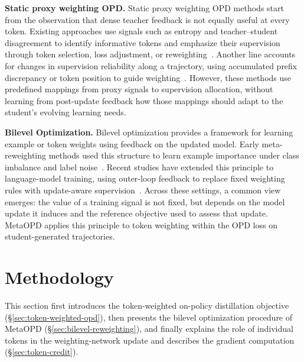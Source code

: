 \documentclass{article}
\theoremstyle{plain}
\theoremstyle{definition}
\theoremstyle{remark}
\begin{document}
\textbf{Static proxy weighting OPD.}
Static proxy weighting OPD methods start from the observation that dense teacher feedback is not equally useful at every token.
Existing approaches use signals such as entropy and teacher--student disagreement to identify informative tokens and emphasize their supervision through token selection, loss adjustment, or reweighting~\citep{jin2026entropy,ko2026scaling,xu2026tip,wang2026not,li2026filter}.
Another line accounts for changes in supervision reliability along a trajectory, using accumulated prefix discrepancy or token position to guide weighting~\citep{xie2026position,liu2026teacher}.
However, these methods use predefined mappings from proxy signals to supervision allocation, without learning from post-update feedback how those mappings should adapt to the student's evolving learning needs.


\textbf{Bilevel Optimization.}
Bilevel optimization provides a framework for learning example or token weights using feedback on the updated model.
Early meta-reweighting methods used this structure to learn example importance under class imbalance and label noise~\citep{ren2018learning,shu2019meta}. 
Recent studies have extended this principle to language-model training, using outer-loop feedback to replace fixed weighting rules with update-aware supervision~\citep{hu2023meta,pan2025scalebio,yu2025llm,zhang2025dorm,li2026learning}. 
Across these settings, a common view emerges: the value of a training signal is not fixed, but depends on the model update it induces and the reference objective used to assess that update. 
MetaOPD applies this principle to token weighting within the OPD loss on student-generated trajectories.

\section{Methodology}
\label{sec:method}

This section first introduces the token-weighted on-policy distillation objective (\S\ref{sec:token-weighted-opd}), then presents the bilevel optimization procedure of MetaOPD (\S\ref{sec:bilevel-reweighting}), and finally explains the role of individual tokens in the weighting-network update and describes the gradient computation (\S\ref{sec:token-credit}).
\end{document}
